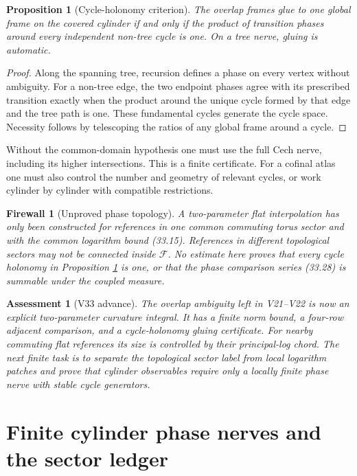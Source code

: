 \documentclass[11pt]{article}
\newtheorem{proposition}[theorem]{Proposition}
\newtheorem{assessment}[theorem]{Assessment}
\newtheorem{firewall}[theorem]{Firewall}
\begin{document}
\begin{proposition}[Cycle-holonomy criterion]
\label{prop:v11v33-cycle}
The overlap frames glue to one global frame on the covered cylinder if
and only if the product of transition phases around every independent
non-tree cycle is one.  On a tree nerve, gluing is automatic.
\end{proposition}

\begin{proof}
Along the spanning tree, recursion defines a phase on every vertex
without ambiguity.  For a non-tree edge, the two endpoint phases agree
with its prescribed transition exactly when the product around the
unique cycle formed by that edge and the tree path is one.  These
fundamental cycles generate the cycle space.  Necessity follows by
telescoping the ratios of any global frame around a cycle.
\end{proof}

Without the common-domain hypothesis one must use the full Cech nerve,
including its higher intersections.  This is a finite certificate.  For a
cofinal atlas one must also control
the number and geometry of relevant cycles, or work cylinder by
cylinder with compatible restrictions.

\begin{firewall}[Unproved phase topology]
\label{fw:v11v33-topology}
A two-parameter flat interpolation has only been constructed for
references in one common commuting torus sector and with the common
logarithm bound (33.15).  References in different topological sectors
may not be connected inside \(\mathcal F\).  No estimate here proves
that every cycle holonomy in Proposition
\ref{prop:v11v33-cycle} is one, or that the phase comparison series
(33.28) is summable under the coupled measure.
\end{firewall}

\begin{assessment}[V33 advance]
\label{ass:v11v33}
The overlap ambiguity left in V21--V22 is now an explicit
two-parameter curvature integral.  It has a finite norm bound, a
four-row adjacent comparison, and a cycle-holonomy gluing certificate.
For nearby commuting flat references its size is controlled by their
principal-log chord.  The next finite task is to separate the
topological sector label from local logarithm patches and prove that
cylinder observables require only a locally finite phase nerve with
stable cycle generators.
\end{assessment}
\section{Finite cylinder phase nerves and the sector ledger}
\label{sec:v11v34}
\end{document}
